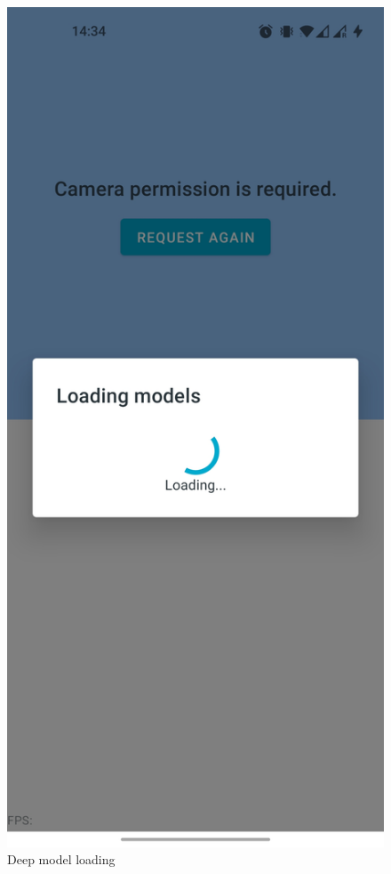 \begin{minipage}{.5\textwidth}
\begin{figure}[H]
    \centering
    \includegraphics[width=\textwidth]{appendix/imgs/app-model-loading.jpg}
    \caption{Deep model loading}
    \label{fig:app-model-loading}
\end{figure}
\end{minipage}

